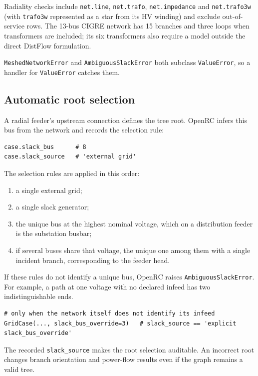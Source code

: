 \documentclass[11pt,a4paper]{report}
\newcommand{\why}[1]{\par\medskip\begingroup\noindent #1\par\endgroup\medskip}
\newcommand{\trap}[1]{\begin{warnbox}#1\end{warnbox}}
\newcommand{\code}[1]{\texttt{\small #1}}
\begin{document}
\trap{Radiality checks include
\code{net.line}, \code{net.trafo}, \code{net.impedance} and
\code{net.trafo3w} (with \code{trafo3w} represented as a star from its HV
winding) and exclude out-of-service rows. The 13-bus CIGRE
network has 15 branches and three loops when transformers are included; its
six transformers also require a model outside the direct DistFlow formulation.}

\code{MeshedNetworkError} and \code{AmbiguousSlackError} both subclass
\code{ValueError}, so a handler for \code{ValueError} catches them.

\subsection{Automatic root selection}

A radial feeder's upstream connection defines the tree root. OpenRC infers
this bus from the network and records the selection rule:

\begin{lstlisting}
case.slack_bus      # 8
case.slack_source   # 'external grid'
\end{lstlisting}

The selection rules are applied in this order:

\begin{enumerate}
\item a single external grid;
\item a single slack generator;
\item the unique bus at the highest nominal voltage, which on a distribution
  feeder is the substation busbar;
\item if several buses share that voltage, the unique one among them with a
  single incident branch, corresponding to the feeder head.
\end{enumerate}

If these rules do not identify a unique bus, OpenRC raises
\code{AmbiguousSlackError}. For example, a path at one voltage with no
declared infeed has two indistinguishable ends.

\begin{lstlisting}
# only when the network itself does not identify its infeed
GridCase(..., slack_bus_override=3)   # slack_source == 'explicit slack_bus_override'
\end{lstlisting}

\why{The recorded \code{slack\_source} makes the root selection auditable.
An incorrect root changes branch orientation and power-flow results even if
the graph remains a valid tree.}
\end{document}
